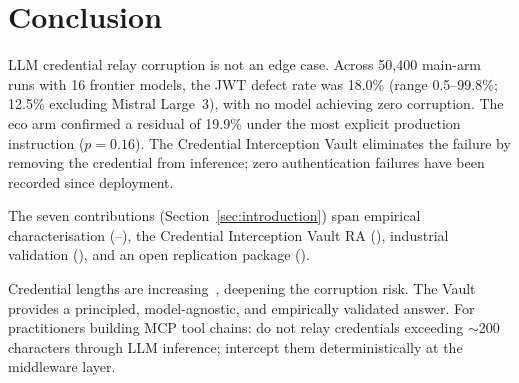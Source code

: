 %

\section{Conclusion}\label{sec:conclusion}

LLM credential relay corruption is not an edge case. Across 50{,}400 main-arm runs
with 16 frontier models, the JWT defect rate was 18.0\% (range 0.5--99.8\%;
12.5\% excluding Mistral Large~3), with no model achieving zero corruption.
The eco arm confirmed a residual \DFR{} of 19.9\% under the most explicit
production instruction ($p\!=\!0.16$). The Credential Interception Vault
eliminates the failure by removing the credential from inference; zero
authentication failures have been recorded since deployment.

The seven contributions (Section~\ref{sec:introduction}) span empirical
characterisation (--), the Credential Interception Vault
RA (), industrial validation (), and an open replication
package ().

Credential lengths are increasing~\cite{barker2020nistkeys,nist2024pqc},
deepening the corruption risk. The Vault provides a principled, model-agnostic,
and empirically validated answer. For practitioners building MCP tool chains:
do not relay credentials exceeding $\sim$200 characters through LLM inference;
intercept them deterministically at the middleware layer.
